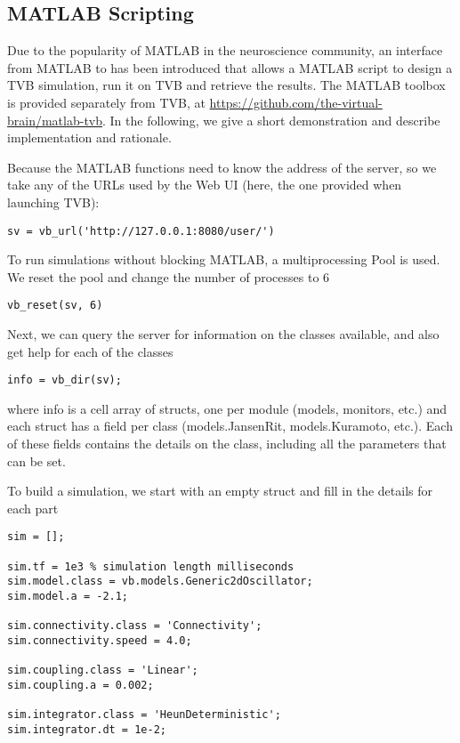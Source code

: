 
\subsection{MATLAB Scripting}

Due to the popularity of MATLAB in the neuroscience community, an
interface from MATLAB to \TVB has been introduced that allows a MATLAB
script to design a TVB simulation, run it on TVB and retrieve the 
results. The MATLAB toolbox is provided separately from TVB, at
\url{https://github.com/the-virtual-brain/matlab-tvb}.
In the following, we give a short demonstration and 
describe implementation and rationale.

Because the MATLAB functions need to know the address of the server,
so we take any of the URLs used by the Web UI (here, the one provided
when launching TVB):

\begin{lstlisting}
sv = vb_url('http://127.0.0.1:8080/user/')
\end{lstlisting}

To run simulations without blocking MATLAB, a multiprocessing Pool
is used. We reset the pool and change the number of processes to 6

\begin{lstlisting}
vb_reset(sv, 6)
\end{lstlisting}

Next, we can query the server for information on the classes available,
and also get help for each of the classes

\begin{lstlisting}
info = vb_dir(sv);
\end{lstlisting}

\noindent where info is a cell array of structs, one per module (models,
monitors, etc.) and each struct has a field per class (models.JansenRit, 
models.Kuramoto, etc.). Each of these fields contains the details on 
the class, including all the parameters that can be set. 

To build a simulation, we start with an empty struct
and fill in the details for each part

\begin{lstlisting}
sim = [];

sim.tf = 1e3 % simulation length milliseconds
sim.model.class = vb.models.Generic2dOscillator;
sim.model.a = -2.1;

sim.connectivity.class = 'Connectivity';
sim.connectivity.speed = 4.0;

sim.coupling.class = 'Linear';
sim.coupling.a = 0.002;

sim.integrator.class = 'HeunDeterministic';
sim.integrator.dt = 1e-2;
\end{lstlisting}

